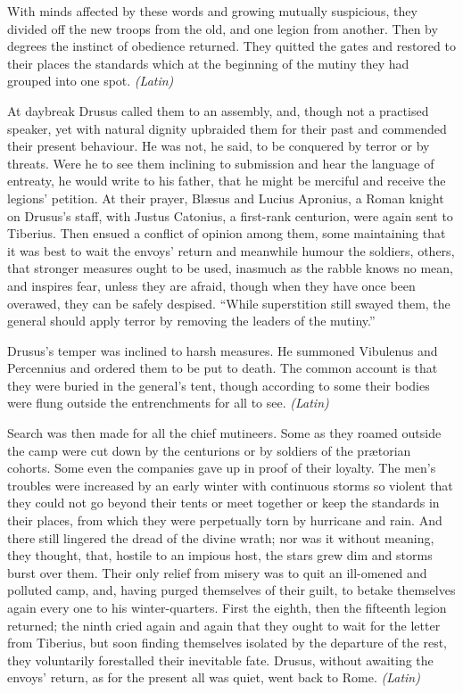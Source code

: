 With minds affected by these words and growing mutually suspicious, they divided off the new troops from the old, and one legion from another. Then by degrees the instinct of obedience returned. They quitted the gates and restored to their places the standards which at the beginning of the mutiny they had grouped into one spot. \emph{(Latin)}


At daybreak Drusus called them to an assembly, and, though not a practised speaker, yet with natural dignity upbraided them for their past and commended their present behaviour. He was not, he said, to be conquered by terror or by threats. Were he to see them inclining to submission and hear the language of entreaty, he would write to his father, that he might be merciful and receive the legions' petition. At their prayer, Blæsus and Lucius Apronius, a Roman knight on Drusus's staff, with Justus Catonius, a first-rank centurion, were again sent to Tiberius. Then ensued a conflict of opinion among them, some maintaining that it was best to wait the envoys' return and meanwhile humour the soldiers, others, that stronger measures ought to be used, inasmuch as the rabble knows no mean, and inspires fear, unless they are afraid, though when they have once been overawed, they can be safely despised. ``While superstition still swayed them, the general should apply terror by removing the leaders of the mutiny.''

Drusus's temper was inclined to harsh measures. He summoned Vibulenus and Percennius and ordered them to be put to death. The common account is that they were buried in the general's tent, though according to some their bodies were flung outside the entrenchments for all to see. \emph{(Latin)}


Search was then made for all the chief mutineers. Some as they roamed outside the camp were cut down by the centurions or by soldiers of the prætorian cohorts. Some even the companies gave up in proof of their loyalty. The men's troubles were increased by an early winter with continuous storms so violent that they could not go beyond their tents or meet together or keep the standards in their places, from which they were perpetually torn by hurricane and rain. And there still lingered the dread of the divine wrath; nor was it without meaning, they thought, that, hostile to an impious host, the stars grew dim and storms burst over them. Their only relief from misery was to quit an ill-omened and polluted camp, and, having purged themselves of their guilt, to betake themselves again every one to his winter-quarters. First the eighth, then the fifteenth legion returned; the ninth cried again and again that they ought to wait for the letter from Tiberius, but soon finding themselves isolated by the departure of the rest, they voluntarily forestalled their inevitable fate. Drusus, without awaiting the envoys' return, as for the present all was quiet, went back to Rome. \emph{(Latin)}

